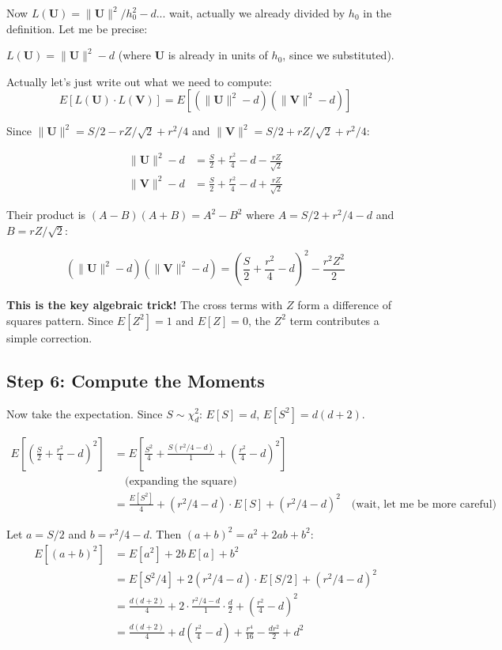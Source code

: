 \documentclass[12pt]{article}
\newcommand{\note}[1]{\begin{tcolorbox}[colback=yellow!5,colframe=yellow!60!black,breakable]\small #1\end{tcolorbox}}
\begin{document}
Now $L(\mathbf{U}) = \|\mathbf{U}\|^2/h_0^2 - d$... wait, actually we already divided by $h_0$ in the definition. Let me be precise:

$L(\mathbf{U}) = \|\mathbf{U}\|^2 - d$ (where $\mathbf{U}$ is already in units of $h_0$, since we substituted).

Actually let's just write out what we need to compute:
$$E[L(\mathbf{U})\cdot L(\mathbf{V})] = E[(\|\mathbf{U}\|^2 - d)(\|\mathbf{V}\|^2 - d)]$$

Since $\|\mathbf{U}\|^2 = S/2 - rZ/\sqrt{2} + r^2/4$ and $\|\mathbf{V}\|^2 = S/2 + rZ/\sqrt{2} + r^2/4$:

\begin{align*}
\|\mathbf{U}\|^2 - d &= \frac{S}{2} + \frac{r^2}{4} - d - \frac{rZ}{\sqrt{2}} \\
\|\mathbf{V}\|^2 - d &= \frac{S}{2} + \frac{r^2}{4} - d + \frac{rZ}{\sqrt{2}}
\end{align*}

Their product is $(A-B)(A+B) = A^2 - B^2$ where $A = S/2 + r^2/4 - d$ and $B = rZ/\sqrt{2}$:

$$(\|\mathbf{U}\|^2-d)(\|\mathbf{V}\|^2-d) = \left(\frac{S}{2}+\frac{r^2}{4}-d\right)^2 - \frac{r^2 Z^2}{2}$$

\note{
\textbf{This is the key algebraic trick!} The cross terms with $Z$ form a difference of squares pattern. Since $E[Z^2] = 1$ and $E[Z] = 0$, the $Z^2$ term contributes a simple correction.}

\subsection{Step 6: Compute the Moments}

Now take the expectation. Since $S \sim \chi^2_d$: $E[S] = d$, $E[S^2] = d(d+2)$.

\begin{align*}
E\left[\left(\frac{S}{2}+\frac{r^2}{4}-d\right)^2\right] &= E\left[\frac{S^2}{4} + \frac{S(r^2/4-d)}{1} + \left(\frac{r^2}{4}-d\right)^2\right] \\[4pt]
&\quad\text{(expanding the square)} \\[4pt]
&= \frac{E[S^2]}{4} + (r^2/4-d)\cdot E[S] + (r^2/4-d)^2 \quad\text{(wait, let me be more careful)}
\end{align*}

Let $a = S/2$ and $b = r^2/4 - d$. Then $(a+b)^2 = a^2 + 2ab + b^2$:
\begin{align*}
E[(a+b)^2] &= E[a^2] + 2b\,E[a] + b^2 \\
&= E[S^2/4] + 2(r^2/4-d)\cdot E[S/2] + (r^2/4-d)^2 \\
&= \frac{d(d+2)}{4} + 2\cdot\frac{r^2/4-d}{1}\cdot\frac{d}{2} + \left(\frac{r^2}{4}-d\right)^2 \\
&= \frac{d(d+2)}{4} + d\left(\frac{r^2}{4}-d\right) + \frac{r^4}{16} - \frac{dr^2}{2} + d^2
\end{align*}
\end{document}
